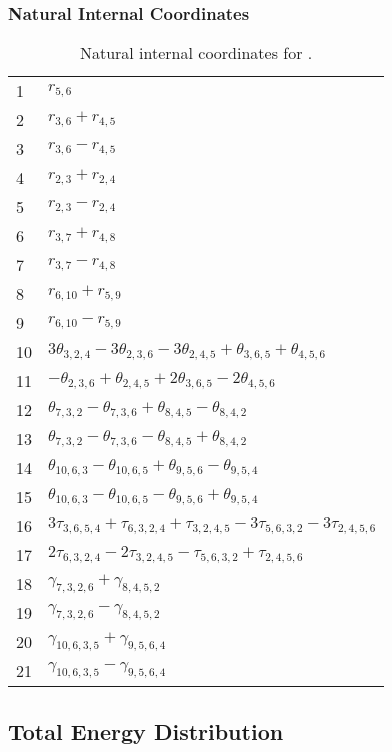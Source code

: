 \documentclass[10pt,oneside]{article}
\begin{document}
\begin{table}[h!]
\subsubsection*{Natural Internal Coordinates}
\centering
\caption{Natural internal coordinates for .}
\small
\begin{tabular}{ll}
\toprule
  1   & $r_{5,6}$ \\
  2   & $r_{3,6} + r_{4,5}$ \\
  3   & $r_{3,6} - r_{4,5}$ \\
  4   & $r_{2,3} + r_{2,4}$ \\
  5   & $r_{2,3} - r_{2,4}$ \\
  6   & $r_{3,7} + r_{4,8}$ \\
  7   & $r_{3,7} - r_{4,8}$ \\
  8   & $r_{6,10} + r_{5,9}$ \\
  9   & $r_{6,10} - r_{5,9}$ \\
  10  & $3\theta_{3,2,4} - 3\theta_{2,3,6} - 3\theta_{2,4,5} + \theta_{3,6,5} + \theta_{4,5,6}$ \\
  11  & $-\theta_{2,3,6} + \theta_{2,4,5} + 2\theta_{3,6,5} - 2\theta_{4,5,6}$ \\
  12  & $\theta_{7,3,2} - \theta_{7,3,6} + \theta_{8,4,5} - \theta_{8,4,2}$ \\
  13  & $\theta_{7,3,2} - \theta_{7,3,6} - \theta_{8,4,5} + \theta_{8,4,2}$ \\
  14  & $\theta_{10,6,3} - \theta_{10,6,5} + \theta_{9,5,6} - \theta_{9,5,4}$ \\
  15  & $\theta_{10,6,3} - \theta_{10,6,5} - \theta_{9,5,6} + \theta_{9,5,4}$ \\
  16  & $3\tau_{3,6,5,4} + \tau_{6,3,2,4} + \tau_{3,2,4,5} - 3\tau_{5,6,3,2} - 3\tau_{2,4,5,6}$ \\
  17  & $2\tau_{6,3,2,4} - 2\tau_{3,2,4,5} - \tau_{5,6,3,2} + \tau_{2,4,5,6}$ \\
  18  & $\gamma_{7,3,2,6} + \gamma_{8,4,5,2}$ \\
  19  & $\gamma_{7,3,2,6} - \gamma_{8,4,5,2}$ \\
  20  & $\gamma_{10,6,3,5} + \gamma_{9,5,6,4}$ \\
  21  & $\gamma_{10,6,3,5} - \gamma_{9,5,6,4}$ \\
\bottomrule
\end{tabular}
\end{table}

\begin{table}
\subsection*{Total Energy Distribution}
\centering\end{table}
\end{document}
